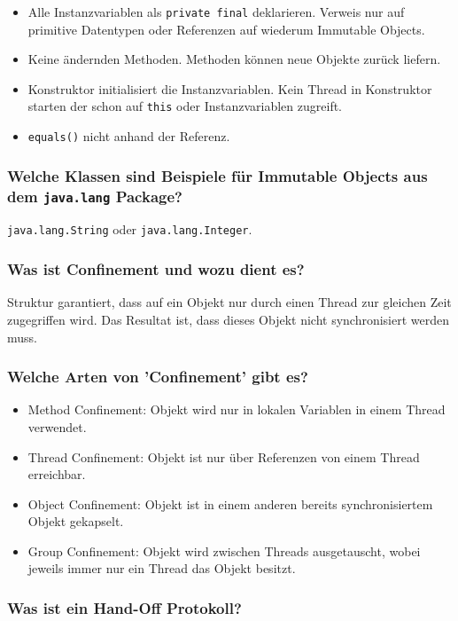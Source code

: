 \documentclass[10pt,a4paper]{scrartcl}
\begin{document}
\begin{itemize}
	\item Alle Instanzvariablen als \texttt{private final} deklarieren. Verweis nur auf primitive
		Datentypen oder Referenzen auf wiederum Immutable Objects.
	\item Keine ändernden Methoden. Methoden können neue Objekte zurück liefern.
	\item Konstruktor initialisiert die Instanzvariablen. Kein Thread in Konstruktor starten der schon
		auf \texttt{this} oder Instanzvariablen zugreift.
	\item \texttt{equals()} nicht anhand der Referenz.
\end{itemize}
  
\subsubsection{Welche Klassen sind Beispiele für Immutable Objects aus dem \texttt{java.lang} Package?}

\texttt{java.lang.String} oder \texttt{java.lang.Integer}.
  
\subsubsection{Was ist Confinement und wozu dient es? }

Struktur garantiert, dass auf ein Objekt nur durch einen Thread zur gleichen Zeit zugegriffen wird.
Das Resultat ist, dass dieses Objekt nicht synchronisiert werden muss.
  
\subsubsection{Welche Arten von 'Confinement' gibt es?}

\begin{itemize}
	\item Method Confinement: Objekt wird nur in lokalen Variablen in einem Thread verwendet.
	\item Thread Confinement: Objekt ist nur über Referenzen von einem Thread erreichbar.
	\item Object Confinement: Objekt ist in einem anderen bereits synchronisiertem Objekt gekapselt.
	\item Group Confinement: Objekt wird zwischen Threads ausgetauscht, wobei jeweils immer nur ein Thread das Objekt besitzt.
\end{itemize}
  
\subsubsection{Was ist ein Hand-Off Protokoll?}
\end{document}
